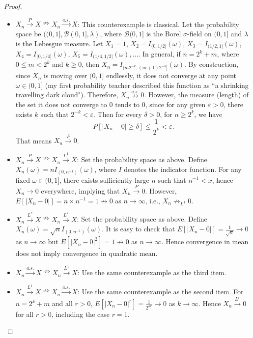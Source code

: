 \documentclass{article}
\newcommand{\eps}{\varepsilon}
\theoremstyle{definition}
\theoremstyle{plain}
\theoremstyle{remark}
\begin{document}
\begin{description}
\begin{proof}
\begin{itemize}
\item $X_n \overset{P}\to X \nRightarrow X_n \overset{a.s.}\to X$: This counterexample is classical. Let the probability space be $((0, 1], \mathscr{B}(0, 1], \lambda)$, where $\mathscr{B}(0, 1]$ is the Borel $\sigma$-field on $(0, 1]$ and $\lambda$ is the Lebesgue measure. Let $X_1 = 1$, $X_2 = I_{(0, 1/2]}(\omega)$, $X_3 = I_{(1/2, 1]}(\omega)$, $X_4 = I_{(0, 1/4]}(\omega)$, $X_5 = I_{(1/4, 1/2]}(\omega), \ldots$. In general, if $n = 2^k + m$, where $0 \leq m < 2^k$ and $k \geq 0$, then $X_n = I_{(m2^{-k}, (m + 1)2^{-k}]}(\omega)$. By construction, since $X_n$ is moving over $(0, 1]$ endlessly, it does not converge at any point $\omega \in (0, 1]$ (my first probability teacher described this function as ``a shrinking travelling dark cloud"). Therefore, $X_n \overset{a.s.}\nrightarrow 0$. However, the measure (length) of the set it does not converge to $0$ tends to $0$, since for any given $\eps > 0$, there exists $k$ such that $2^{-k} < \eps$. Then for every $\delta > 0$, for $n \geq 2^k$, we have
$$P[|X_n - 0| \geq \delta] \leq \frac{1}{2^k} < \eps.$$
That means $X_n \overset{P}\to 0$.

\item $X_n \overset{P}\to X \nRightarrow X_n \overset{L^1}\to X$: Set the probability space as above. Define $X_n(\omega) = nI_{(0, n^{-1})}(\omega)$, where $I$ denotes the indicator function. For any fixed $\omega \in (0, 1]$, there exists sufficiently large $n$ such that $n^{-1} < x$, hence $X_n \to 0$ everywhere, implying that $X_n \overset{P}\to 0$. However, $E[|X_n - 0|] = n \times n^{-1} = 1 \not\to 0$ as $n \to \infty$, i.e., $X_n \not\to_{L^1} 0$.

\item $X_n \overset{L^r}\to X \nRightarrow X_n \overset{L^s}\to X$: Set the probability space as above. Define $X_n(\omega) = \sqrt{n}I_{(0, n^{-1})}(\omega)$. It is easy to check that $E[|X_n - 0|] = \frac{1}{\sqrt{n}} \to 0$ as $n \to \infty$ but $E[|X_n - 0|^2] = 1 \not\to 0$ as $n \to \infty$. Hence convergence in mean does not imply convergence in quadratic mean.

\item $X_n \overset{a.s.}\to X \nRightarrow X_n \overset{L^1}\to X$: Use the same counterexample as the third item.

\item $X_n \overset{L^1}\to X \nRightarrow X_n \overset{a.s.}\to X$: Use the same counterexample as the second item. For $n = 2^k + m$ and all $r > 0$, $E[|X_n - 0|^r] = \frac{1}{2^{kr}} \to 0$ as $k \to \infty$. Hence $X_n \overset{L^r}\to 0$ for all $r > 0$, including the case $r = 1$.
\end{itemize}
\end{proof}


\end{description}
\end{document}
